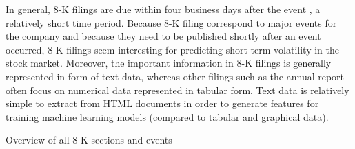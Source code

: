 \documentclass{article}
\begin{document}
	In general, 8-K filings are  due within four business days after the event \cite{kenton_8-k_nodate}, a relatively short time period. Because 8-K filing correspond to major events for the company and because they need to be published shortly after an event occurred, 8-K filings seem interesting for predicting short-term volatility in the stock market. Moreover, the important information in 8-K filings is generally represented in form of text data, whereas other filings such as the annual report often focus on numerical data represented in tabular form. Text data is relatively simple to extract from HTML documents in order to generate features for training machine learning models (compared to tabular and graphical data).
	
	
	\begin{table}[h!]
	\centering
	\caption{Overview of all 8-K sections and events}
	\label{table:8kevents}
	

\end{table}
\end{document}

